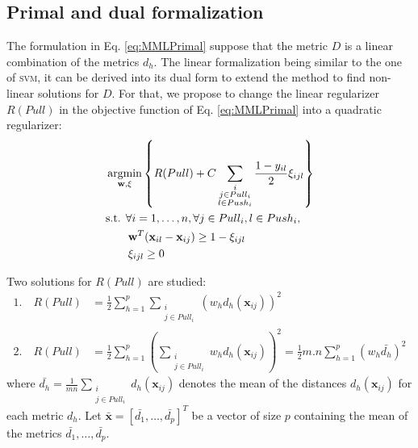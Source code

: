 \subsection{Primal and dual formalization}
The formulation in Eq. \ref{eq:MMLPrimal} suppose that the metric $D$ is a linear combination of the metrics $d_h$. The linear formalization being similar to the one of \textsc{svm}, it can be derived into its dual form to extend the method to find non-linear solutions for $D$. For that, we propose to change the linear regularizer $R(Pull)$ in the objective function of Eq. \ref{eq:MMLPrimal} into a quadratic regularizer: 
\begin{equation}
\begin{aligned}
&\displaystyle 		\argmin_{\textbf{w},\xi}
\left\lbrace 
		R(Pull)				
+	
C 			
	\sum\limits_{\substack{i \\ j \in Pull_i \\ l \in Push_i}} \frac{1-y_{il}}{2} \xi_{ijl}
\right\rbrace \\
&\text{s.t.  } \forall i = 1, \ldots, n, \forall j \in Pull_i, l \in Push_i, \\
& \qquad \textbf{w}^T(\textbf{x}_{il}-\textbf{x}_{ij}) \geq 1-\xi_{ijl}  \\
& \qquad \xi_{ijl} \geq 0
\label{eq:MMLPrimal2} 
\end{aligned}
\end{equation}

\noindent Two solutions for $R(Pull)$ are studied:
\begin{align}
1. \quad R(Pull) & = \frac{1}{2} \sum\limits_{h=1}^{p} \sum\limits_{\substack{i \\ j \in Pull_i}} \left( w_h d_h(\textbf{x}_{ij})\right) ^2 \label{eq:regularizer1}\\
2. \quad R(Pull) 
& = \frac{1}{2} \sum\limits_{h=1}^{p} \left( \sum\limits_{\substack{i \\ j \in Pull_i}} w_h d_h(\textbf{x}_{ij})\right)^2 
= \frac{1}{2}m.n \sum\limits_{h=1}^{p} \left( w_h \bar{d_h} \right) ^2 \label{eq:regularizer2}
\end{align}
where $\bar{d_h} = \frac{1}{mn} \sum\limits_{\substack{i \\ j \in Pull_i}} d_h(\textbf{x}_{ij})$ denotes the mean of the distances $d_h(\textbf{x}_{ij})$ for each metric $d_h$. Let $\bar{\textbf{x}}=[\bar{d_1}, \ldots, \bar{d_p}]^T$ be a vector of size $p$ containing the mean of the metrics $\bar{d_1}, \ldots, \bar{d_p}$.\\

